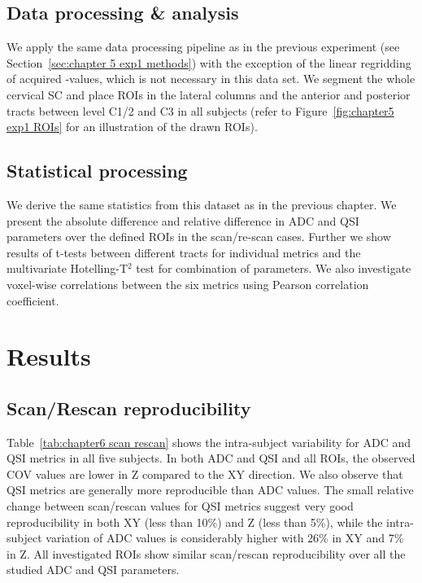 \subsection{Data processing \& analysis}
We apply the same data processing pipeline as in the previous experiment (see Section~\ref{sec:chapter 5 exp1 methods}) with the exception of the linear regridding of acquired \q-values, which is not necessary in this data set. We segment the whole cervical {\gls{SC}} and place \glspl{ROI} in the lateral columns and the anterior and posterior tracts between level C1/2 and C3 in all subjects (refer to Figure~\ref{fig:chapter5 exp1 ROIs} for an illustration of the drawn \glspl{ROI}).

\subsection{Statistical processing} We derive the same statistics from this dataset as in the previous chapter. We present the absolute difference and relative difference in ADC and \gls{QSI} parameters over the defined \glspl{ROI} in the scan/re-scan cases. Further we show results of t-tests between different tracts for individual metrics and the multivariate Hotelling-T$^2$ test for combination of parameters. We also investigate voxel-wise correlations between the six metrics using Pearson correlation coefficient.


\section{Results}
\subsection{Scan/Rescan reproducibility}
\label{par:chapter6 reproducibility}
Table~\ref{tab:chapter6 scan rescan} shows the intra-subject variability for ADC and QSI metrics in all five subjects. In both ADC and QSI and all \glspl{ROI}, the observed COV values are lower in Z compared to the XY direction. We also observe that QSI metrics are generally more reproducible than ADC values. The small relative change between scan/rescan values for QSI metrics suggest very good reproducibility in both XY (less than 10\%) and Z (less than 5\%), while the intra-subject variation of ADC values is considerably higher with 26\% in XY and 7\% in Z. All investigated \glspl{ROI} show similar scan/rescan reproducibility over all the studied ADC and QSI parameters.

